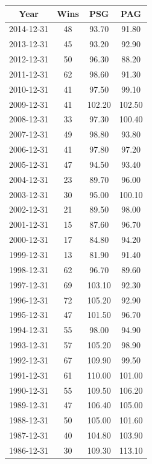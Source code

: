 \documentclass[a4paper]{article}
\begin{document}
\begin{table}[H]
\centering
\begin{tabular}{| c | c | c | c|}
  \hline
Year & Wins & PSG & PAG \\ 
  \hline
2014-12-31 & 48 & 93.70 & 91.80 \\ 
  2013-12-31 & 45 & 93.20 & 92.90 \\ 
  2012-12-31 & 50 & 96.30 & 88.20 \\ 
  2011-12-31 & 62 & 98.60 & 91.30 \\ 
  2010-12-31 & 41 & 97.50 & 99.10 \\ 
  2009-12-31 & 41 & 102.20 & 102.50 \\ 
  2008-12-31 & 33 & 97.30 & 100.40 \\ 
  2007-12-31 & 49 & 98.80 & 93.80 \\ 
  2006-12-31 & 41 & 97.80 & 97.20 \\ 
  2005-12-31 & 47 & 94.50 & 93.40 \\ 
  2004-12-31 & 23 & 89.70 & 96.00 \\ 
  2003-12-31 & 30 & 95.00 & 100.10 \\ 
  2002-12-31 & 21 & 89.50 & 98.00 \\ 
  2001-12-31 & 15 & 87.60 & 96.70 \\ 
  2000-12-31 & 17 & 84.80 & 94.20 \\ 
  1999-12-31 & 13 & 81.90 & 91.40 \\ 
  1998-12-31 & 62 & 96.70 & 89.60 \\ 
  1997-12-31 & 69 & 103.10 & 92.30 \\ 
  1996-12-31 & 72 & 105.20 & 92.90 \\ 
  1995-12-31 & 47 & 101.50 & 96.70 \\ 
  1994-12-31 & 55 & 98.00 & 94.90 \\ 
  1993-12-31 & 57 & 105.20 & 98.90 \\ 
  1992-12-31 & 67 & 109.90 & 99.50 \\ 
  1991-12-31 & 61 & 110.00 & 101.00 \\ 
  1990-12-31 & 55 & 109.50 & 106.20 \\ 
  1989-12-31 & 47 & 106.40 & 105.00 \\ 
  1988-12-31 & 50 & 105.00 & 101.60 \\ 
  1987-12-31 & 40 & 104.80 & 103.90 \\ 
  1986-12-31 & 30 & 109.30 & 113.10 \\ 

\end{tabular}
\end{table}
\end{document}
